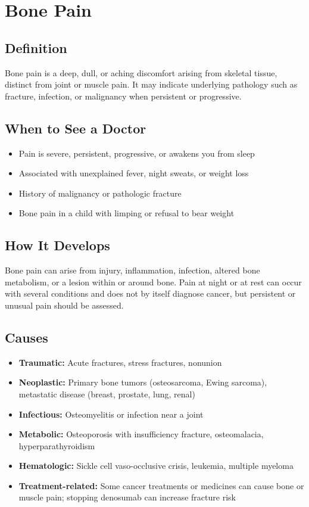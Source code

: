 \chapter{Bone Pain}

\section*{Definition}
Bone pain is a deep, dull, or aching discomfort arising from skeletal tissue, distinct from joint or muscle pain. It may indicate underlying pathology such as fracture, infection, or malignancy when persistent or progressive.

\section*{When to See a Doctor}

\begin{itemize}
 \item Pain is severe, persistent, progressive, or awakens you from sleep
 \item Associated with unexplained fever, night sweats, or weight loss
 \item History of malignancy or pathologic fracture
 \item Bone pain in a child with limping or refusal to bear weight
\end{itemize}

\section*{How It Develops}
Bone pain can arise from injury, inflammation, infection, altered bone metabolism, or a lesion within or around bone. Pain at night or at rest can occur with several conditions and does not by itself diagnose cancer, but persistent or unusual pain should be assessed.

\section*{Causes}
\begin{itemize}
 \item \textbf{Traumatic:} Acute fractures, stress fractures, nonunion
 \item \textbf{Neoplastic:} Primary bone tumors (osteosarcoma, Ewing sarcoma), metastatic disease (breast, prostate, lung, renal)
 \item \textbf{Infectious:} Osteomyelitis or infection near a joint
 \item \textbf{Metabolic:} Osteoporosis with insufficiency fracture, osteomalacia, hyperparathyroidism
 \item \textbf{Hematologic:} Sickle cell vaso-occlusive crisis, leukemia, multiple myeloma
 \item \textbf{Treatment-related:} Some cancer treatments or medicines can cause bone or muscle pain; stopping denosumab can increase fracture risk
\end{itemize}

